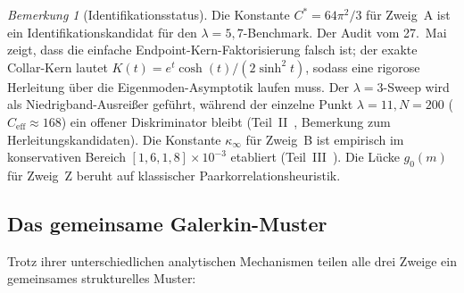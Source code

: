 \documentclass[12pt,a4paper]{article}
\theoremstyle{definition}
\theoremstyle{remark}
\newtheorem{remark}[theorem]{Bemerkung}
\begin{document}
\begin{center}
\renewcommand{\arraystretch}{1.3}
\end{center}

\begin{remark}[Identifikationsstatus]
Die Konstante $C^* = 64\pi^2/3$ für Zweig~A ist ein Identifikationskandidat
für den $\lambda=5,7$-Benchmark. Der Audit vom 27.~Mai zeigt, dass die
einfache Endpoint-Kern-Faktorisierung falsch ist; der exakte Collar-Kern
lautet $K(t)=e^t\cosh(t)/(2\sinh^2t)$, sodass eine rigorose Herleitung über
die Eigenmoden-Asymptotik laufen muss. Der $\lambda=3$-Sweep wird als
Niedrigband-Ausreißer geführt, während der einzelne Punkt
$\lambda=11,N=200$ ($C_{\mathrm{eff}}\approx168$) ein offener
Diskriminator bleibt
(Teil~II~\cite{Geiger2026partII}, Bemerkung zum Herleitungskandidaten). Die
Konstante $\kappa_\infty$ für Zweig~B ist empirisch im konservativen Bereich
$[1{,}6,1{,}8]\times 10^{-3}$ etabliert (Teil~III~\cite{Geiger2026partIII}). Die Lücke
$g_0(m)$ für Zweig~Z beruht auf klassischer Paarkorrelationsheuristik.
\end{remark}


\subsection{Das gemeinsame Galerkin-Muster}

Trotz ihrer unterschiedlichen analytischen Mechanismen teilen alle drei
Zweige ein gemeinsames strukturelles Muster:
\end{document}
